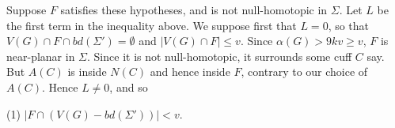 Suppose $F$ satisfies these hypotheses, and is not null-homotopic in $\Sigma$. Let $L$ be the first term in the inequality above. We suppose first that $L = 0$, so that $V(G) \cap F \cap bd(\Sigma') = \emptyset$ and $|V(G) \cap F| \le v$. Since $\alpha(G) > 9kv \ge v$, $F$ is near-planar in $\Sigma$. Since it is not null-homotopic, it surrounds some cuff $C$ say. But $A(C)$ is inside $N(C)$ and hence inside $F$, contrary to our choice of $A(C)$. Hence $L \ne 0$, and so

\hspace*{12pt}(1) $|F \cap (V(G) - bd(\Sigma'))| < v$.
